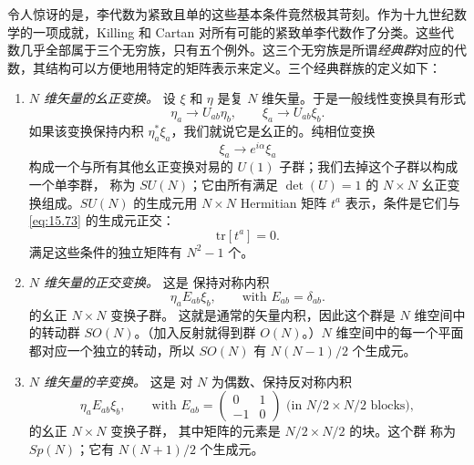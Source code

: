 令人惊讶的是，李代数为紧致且单的这些基本条件竟然极其苛刻。作为十九世纪数学的一项成就，Killing 和 Cartan 对所有可能的紧致单李代数作了分类。这些代数几乎全部属于三个无穷族，只有五个例外。这三个无穷族是所谓\emph{经典群}对应的代数，其结构可以方便地用特定的矩阵表示来定义。三个经典群族的定义如下：
\begin{enumerate}
  \item \emph{$N$ 维矢量的幺正变换。} 设
    $\xi$ 和 $\eta$ 是复 $N$ 维矢量。于是一般线性变换具有形式
    \begin{equation}
      \eta_a \to U_{ab}\eta_b,\qquad \xi_a \to U_{ab}\xi_b .
      \label{eq:15.72}
    \end{equation}
    如果该变换保持内积
    $\eta^{*}_a\xi_a$，我们就说它是幺正的。纯相位变换
    \begin{equation}
      \xi_a \to e^{i\alpha}\xi_a
      \label{eq:15.73}
    \end{equation}
    构成一个与所有其他幺正变换对易的 $U(1)$ 子群；我们去掉这个子群以构成一个单李群，
    称为 $SU(N)$；它由所有满足 $\det(U) = 1$ 的 $N\times N$ 幺正变换组成。$SU(N)$ 的生成元用
    $N\times N$ Hermitian 矩阵 $t^a$ 表示，条件是它们与 \eqref{eq:15.73} 的生成元正交：
    \begin{equation}
      \mathrm{tr}[t^a] = 0 .
      \label{eq:15.74}
    \end{equation}
    满足这些条件的独立矩阵有 $N^2-1$ 个。
  \item \emph{$N$ 维矢量的正交变换。} 这是
    保持对称内积
    \begin{equation}
      \eta_a E_{ab}\xi_b,
      \qquad\text{with } E_{ab} = \delta_{ab} .
      \label{eq:15.75}
    \end{equation}
    的幺正 $N\times N$ 变换子群。
    这就是通常的矢量内积，因此这个群是 $N$ 维空间中的转动群
    $SO(N)$。（加入反射就得到群
    $O(N)$。）$N$ 维空间中的每一个平面都对应一个独立的转动，所以 $SO(N)$ 有 $N(N-1)/2$ 个生成元。
  \item \emph{$N$ 维矢量的辛变换。} 这是
    对 $N$ 为偶数、保持反对称内积
    \begin{equation}
      \eta_a E_{ab}\xi_b,
      \qquad\text{with } E_{ab} = \begin{pmatrix}0&1\\-1&0\end{pmatrix}
      \text{ (in } N/2\times N/2 \text{ blocks)},
      \label{eq:15.76}
    \end{equation}
    的幺正 $N\times N$ 变换子群，
    其中矩阵的元素是 $N/2\times N/2$ 的块。这个群
    称为 $Sp(N)$；它有 $N(N+1)/2$ 个生成元。
\end{enumerate}

